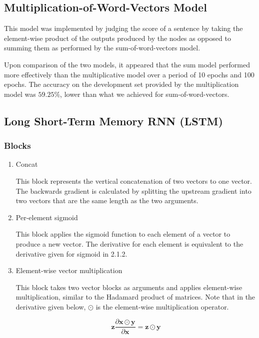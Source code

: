 \documentclass{article} %
\begin{document}
\subsection{Multiplication-of-Word-Vectors Model}

This model was implemented by judging the score of a sentence by taking the element-wise product of the outputs produced by the nodes as opposed to summing them as performed by the sum-of-word-vectors model. 

Upon comparison of the two models, it appeared that the sum model performed more effectively than the multiplicative model over a period of 10 epochs and 100 epochs. The accuracy on the development set provided by the multiplication model was $59.25\%$, lower than what we achieved for sum-of-word-vectors.

\subsection{Long Short-Term Memory RNN (LSTM)}

\subsubsection{Blocks}

\begin{enumerate}

\item Concat

This block represents the vertical concatenation of two vectors to one vector. The backwards gradient is calculated by splitting the upstream gradient into two vectors that are the same length as the two arguments.

\item

Per-element sigmoid

This block applies the sigmoid function to each element of a vector to produce a new vector. The derivative for each element is equivalent to the derivative given for sigmoid in 2.1.2.

\item

Element-wise vector multiplication

This block takes two vector blocks as arguments and applies element-wise multiplication, similar to the Hadamard product of matrices. Note that in the derivative given below, $\odot$ is the element-wise multiplication operator.

\[
\mathbf{z} \frac{\partial \mathbf{x} \odot \mathbf{y}}{\partial \mathbf{x}} = \mathbf{z} \odot \mathbf{y}
\]

\end{enumerate}
\end{document}
